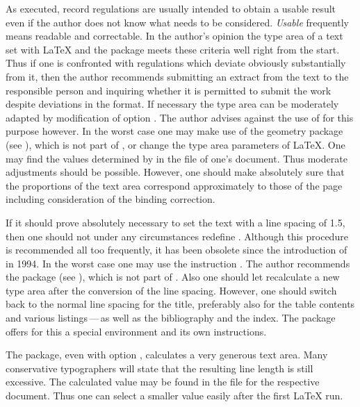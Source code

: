 As executed, record regulations are usually intended to obtain a usable result
even if the author does not know what needs to be considered. \emph{Usable}
frequently means readable and correctable.  In the author's opinion the type
area of a text set with {\LaTeX} and the  package meets
these criteria well right from the start.  Thus if one is confronted with
regulations which deviate obviously substantially from it, then the author
recommends submitting an extract from the text to the responsible person and
inquiring whether it is permitted to submit the work despite deviations in the
format.  If necessary the type area can be moderately adapted by modification
of option .  The author advises against the use
of  for this purpose however.  In the worst
case one may make use of the geometry package (see \cite{package:geometry}),
which is not part of \KOMAScript, or change the type area parameters of
\LaTeX.  One may find the values determined by  in the
 file of one's document.  Thus moderate adjustments should be
possible.  However, one should make absolutely sure that the proportions of
the text area correspond approximately to those of the page including
consideration of the binding correction.

If it should prove absolutely necessary to set the text with a line
spacing of 1.5, then one should not under any circumstances redefine
.  Although this procedure is recommended all
too frequently, it has been obsolete since the introduction of
{\LaTeXe} in 1994.  In the worst case one may use the instruction
.  The author recommends the package
 (see
\cite{package:setspace}), which is not part of \KOMAScript.  Also one
should let  recalculate a new type area after the
conversion of the line spacing.  However, one should switch back to
the normal line spacing for the title, preferably also for the table
contents and various listings\,---\,as well as the bibliography and
the index.  The  package offers for this a special
environment and its own instructions.

The  package, even with option
, calculates a very generous text area.
Many conservative typographers will state that the resulting line length is
still excessive. The calculated  value may be found in the 
file for the respective document.  Thus one can select a smaller value easily
after the first {\LaTeX} run.

